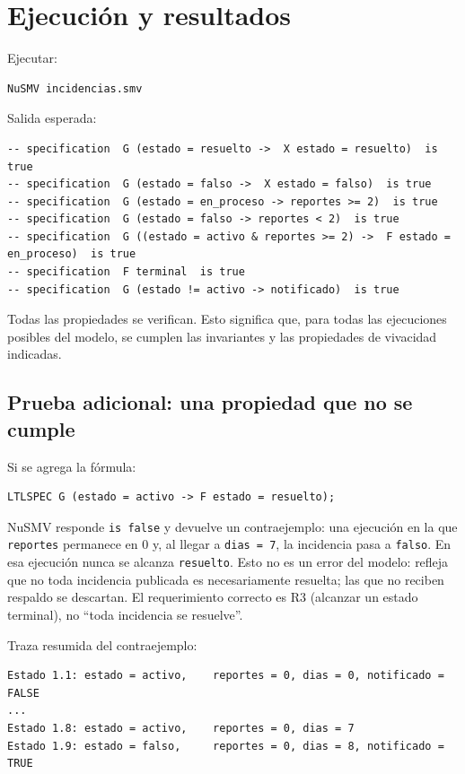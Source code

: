 \documentclass[11pt,a4paper]{article}
\begin{document}
\section{Ejecución y resultados}

Ejecutar:

\begin{lstlisting}
NuSMV incidencias.smv
\end{lstlisting}

Salida esperada:

\begin{lstlisting}
-- specification  G (estado = resuelto ->  X estado = resuelto)  is true
-- specification  G (estado = falso ->  X estado = falso)  is true
-- specification  G (estado = en_proceso -> reportes >= 2)  is true
-- specification  G (estado = falso -> reportes < 2)  is true
-- specification  G ((estado = activo & reportes >= 2) ->  F estado = en_proceso)  is true
-- specification  F terminal  is true
-- specification  G (estado != activo -> notificado)  is true
\end{lstlisting}

Todas las propiedades se verifican. Esto significa que, para todas las ejecuciones posibles del modelo, se cumplen las invariantes y las propiedades de vivacidad indicadas.

\subsection{Prueba adicional: una propiedad que no se cumple}

Si se agrega la fórmula:

\begin{lstlisting}
LTLSPEC G (estado = activo -> F estado = resuelto);
\end{lstlisting}

NuSMV responde \texttt{is false} y devuelve un contraejemplo: una ejecución en la que \texttt{reportes} permanece en 0 y, al llegar a \texttt{dias = 7}, la incidencia pasa a \texttt{falso}. En esa ejecución nunca se alcanza \texttt{resuelto}. Esto no es un error del modelo: refleja que no toda incidencia publicada es necesariamente resuelta; las que no reciben respaldo se descartan. El requerimiento correcto es R3 (alcanzar un estado terminal), no ``toda incidencia se resuelve''.

Traza resumida del contraejemplo:

\begin{lstlisting}
Estado 1.1: estado = activo,    reportes = 0, dias = 0, notificado = FALSE
...
Estado 1.8: estado = activo,    reportes = 0, dias = 7
Estado 1.9: estado = falso,     reportes = 0, dias = 8, notificado = TRUE
\end{lstlisting}
\end{document}
